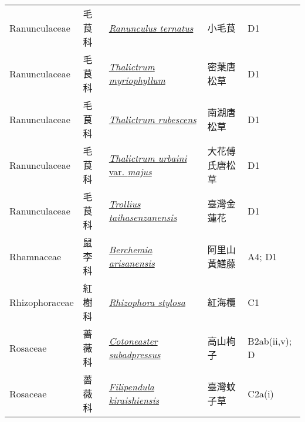 {\begin{longtable}{L{2.5cm}L{2cm}L{5cm}L{2.5cm}L{3cm}}
    Ranunculaceae & 毛茛科 & \href{http://www.theplantlist.org/tpl1.1/search?q=Ranunculus+ternatus}{\textit{Ranunculus ternatus} } & 小毛茛 & D1    \\
    Ranunculaceae & 毛茛科 & \href{http://www.theplantlist.org/tpl1.1/search?q=Thalictrum+myriophyllum}{\textit{Thalictrum myriophyllum} } & 密葉唐松草 & D1    \\
    Ranunculaceae & 毛茛科 & \href{http://www.theplantlist.org/tpl1.1/search?q=Thalictrum+rubescens}{\textit{Thalictrum rubescens} } & 南湖唐松草 & D1    \\
    Ranunculaceae & 毛茛科 & \href{http://www.theplantlist.org/tpl1.1/search?q=Thalictrum+urbaini+var.+majus}{\textit{Thalictrum urbaini} var. \textit{majus} } & 大花傅氏唐松草 & D1    \\
    Ranunculaceae & 毛茛科 & \href{http://www.theplantlist.org/tpl1.1/search?q=Trollius+taihasenzanensis}{\textit{Trollius taihasenzanensis} } & 臺灣金蓮花 & D1    \\
    Rhamnaceae & 鼠李科 & \href{http://www.theplantlist.org/tpl1.1/search?q=Berchemia+arisanensis}{\textit{Berchemia arisanensis} } & 阿里山黃鱔藤 & A4; D1    \\
    Rhizophoraceae & 紅樹科 & \href{http://www.theplantlist.org/tpl1.1/search?q=Rhizophora+stylosa}{\textit{Rhizophora stylosa} } & 紅海欖 & C1    \\
    Rosaceae & 薔薇科 & \href{http://www.theplantlist.org/tpl1.1/search?q=Cotoneaster+subadpressus}{\textit{Cotoneaster subadpressus} } & 高山栒子 & B2ab(ii,v); D    \\
    Rosaceae & 薔薇科 & \href{http://www.theplantlist.org/tpl1.1/search?q=Filipendula+kiraishiensis}{\textit{Filipendula kiraishiensis} } & 臺灣蚊子草 & C2a(i)    \\

\end{longtable}}
